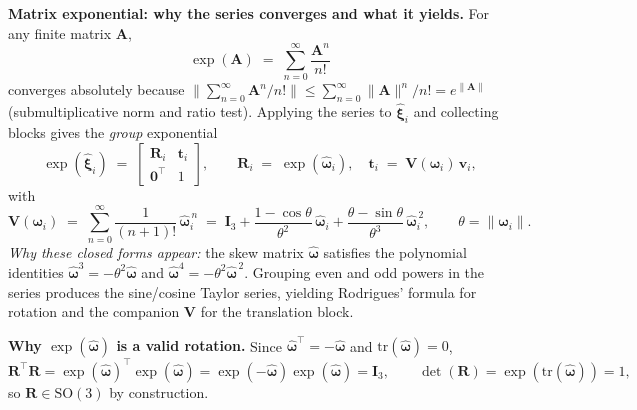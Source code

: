 \begin{enrichment}
\begin{enrichment}
        \textbf{Matrix exponential: why the series converges and what it yields.}
        For any finite matrix \(\mathbf{A}\),
        \[
        \exp(\mathbf{A}) \;=\; \sum_{n=0}^{\infty}\frac{\mathbf{A}^n}{n!}
        \]
        converges absolutely because \(\big\|\sum_{n=0}^{\infty}\mathbf{A}^n/n!\big\|
        \le \sum_{n=0}^{\infty}\|\mathbf{A}\|^n/n! = e^{\|\mathbf{A}\|}\) (submultiplicative norm and ratio test).  
        Applying the series to \(\widehat{\boldsymbol{\xi}}_i\) and collecting blocks gives the \emph{group} exponential
        \[
        \exp(\widehat{\boldsymbol{\xi}}_i)
        \;=\;
        \begin{bmatrix}
            \mathbf{R}_i & \mathbf{t}_i\\
            \mathbf{0}^\top & 1
        \end{bmatrix},
        \qquad
        \mathbf{R}_i \;=\; \exp(\widehat{\boldsymbol{\omega}}_i),\quad
        \mathbf{t}_i \;=\; \mathbf{V}(\boldsymbol{\omega}_i)\,\mathbf{v}_i,
        \]
        with
        \[
        \mathbf{V}(\boldsymbol{\omega}_i)
        \;=\;
        \sum_{n=0}^\infty \frac{1}{(n+1)!}\,\widehat{\boldsymbol{\omega}}_i^{\,n}
        \;=\;
        \mathbf{I}_3
        + \frac{1-\cos\theta}{\theta^2}\,\widehat{\boldsymbol{\omega}}_i
        + \frac{\theta-\sin\theta}{\theta^3}\,\widehat{\boldsymbol{\omega}}_i^{\,2},
        \qquad
        \theta=\|\boldsymbol{\omega}_i\|.
        \]
        \emph{Why these closed forms appear:} the skew matrix \(\widehat{\boldsymbol{\omega}}\) satisfies the polynomial identities
        \(\widehat{\boldsymbol{\omega}}^3=-\theta^2\widehat{\boldsymbol{\omega}}\) and
        \(\widehat{\boldsymbol{\omega}}^4=-\theta^2\widehat{\boldsymbol{\omega}}^{\,2}\).
        Grouping even and odd powers in the series produces the sine/cosine Taylor series, yielding Rodrigues’ formula for rotation and the companion \(\mathbf{V}\) for the translation block.
        
        \textbf{Why \(\exp(\widehat{\boldsymbol{\omega}})\) is a valid rotation.}
        Since \(\widehat{\boldsymbol{\omega}}^\top=-\widehat{\boldsymbol{\omega}}\) and \(\mathrm{tr}(\widehat{\boldsymbol{\omega}})=0\),
        \[
        \mathbf{R}^\top\mathbf{R}
        =\exp(\widehat{\boldsymbol{\omega}})^\top\exp(\widehat{\boldsymbol{\omega}})
        =\exp(-\widehat{\boldsymbol{\omega}})\exp(\widehat{\boldsymbol{\omega}})=\mathbf{I}_3,
        \qquad
        \det(\mathbf{R})=\exp(\mathrm{tr}(\widehat{\boldsymbol{\omega}}))=1,
        \]
        so \(\mathbf{R}\in\mathrm{SO}(3)\) by construction.
        

\end{enrichment}
\end{enrichment}
